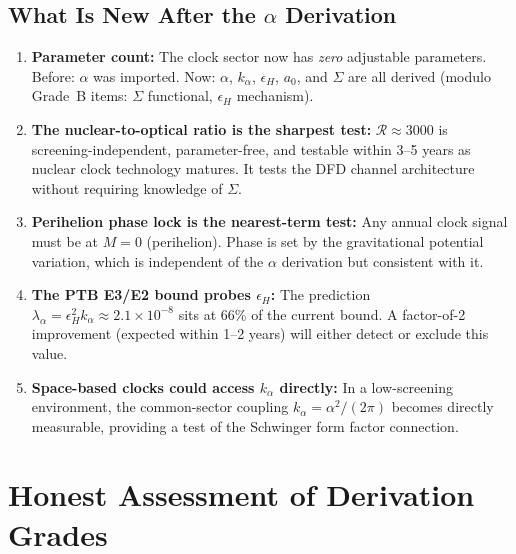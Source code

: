 \documentclass[11pt]{article}
\newcommand{\kalpha}{k_\alpha}
\theoremstyle{definition}
\theoremstyle{remark}
\begin{document}
\subsection{What Is New After the $\alpha$ Derivation}

\begin{enumerate}
\item \textbf{Parameter count:} The clock sector now has \emph{zero}
  adjustable parameters. Before: $\alpha$ was imported. Now: $\alpha$,
  $\kalpha$, $\epsilon_H$, $a_0$, and $\Sigma$ are all derived
  (modulo Grade~B items: $\Sigma$ functional, $\epsilon_H$ mechanism).

\item \textbf{The nuclear-to-optical ratio is the sharpest test:}
  $\mathcal{R} \approx 3000$ is screening-independent, parameter-free, and
  testable within 3--5 years as nuclear clock technology matures. It tests
  the DFD channel architecture without requiring knowledge of $\Sigma$.

\item \textbf{Perihelion phase lock is the nearest-term test:} Any annual
  clock signal must be at $M = 0$ (perihelion). Phase is set by the
  gravitational potential variation, which is independent of the $\alpha$
  derivation but consistent with it.

\item \textbf{The PTB E3/E2 bound probes $\epsilon_H$:} The prediction
  $\lambda_\alpha = \epsilon_H^2 \kalpha \approx 2.1 \times 10^{-8}$
  sits at 66\% of the current bound. A factor-of-2 improvement (expected
  within 1--2 years) will either detect or exclude this value.

\item \textbf{Space-based clocks could access $\kalpha$ directly:}
  In a low-screening environment, the common-sector coupling
  $\kalpha = \alpha^2/(2\pi)$ becomes directly measurable, providing
  a test of the Schwinger form factor connection.
\end{enumerate}

\section{Honest Assessment of Derivation Grades}
\label{sec:grades}
\end{document}
